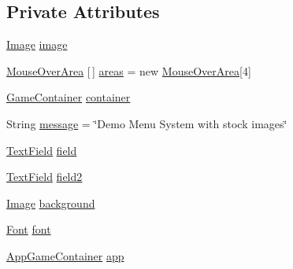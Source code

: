 \subsection*{Private Attributes}
\begin{DoxyCompactItemize}
\item 
\mbox{\hyperlink{classorg_1_1newdawn_1_1slick_1_1_image}{Image}} \mbox{\hyperlink{classorg_1_1newdawn_1_1slick_1_1tests_1_1_g_u_i_test_aa3aa6128aa0296efb8c6489084ce0a29}{image}}
\item 
\mbox{\hyperlink{classorg_1_1newdawn_1_1slick_1_1gui_1_1_mouse_over_area}{Mouse\+Over\+Area}} \mbox{[}$\,$\mbox{]} \mbox{\hyperlink{classorg_1_1newdawn_1_1slick_1_1tests_1_1_g_u_i_test_a45e7638907d2d4662aca08ffa006a326}{areas}} = new \mbox{\hyperlink{classorg_1_1newdawn_1_1slick_1_1gui_1_1_mouse_over_area}{Mouse\+Over\+Area}}\mbox{[}4\mbox{]}
\item 
\mbox{\hyperlink{classorg_1_1newdawn_1_1slick_1_1_game_container}{Game\+Container}} \mbox{\hyperlink{classorg_1_1newdawn_1_1slick_1_1tests_1_1_g_u_i_test_a71a14c16d92d7fbb77511e4fc241e8b9}{container}}
\item 
String \mbox{\hyperlink{classorg_1_1newdawn_1_1slick_1_1tests_1_1_g_u_i_test_abd20571a152e1beddc3e70a5c3e348a6}{message}} = \char`\"{}Demo Menu System with stock images\char`\"{}
\item 
\mbox{\hyperlink{classorg_1_1newdawn_1_1slick_1_1gui_1_1_text_field}{Text\+Field}} \mbox{\hyperlink{classorg_1_1newdawn_1_1slick_1_1tests_1_1_g_u_i_test_ac005591c69d926ba54c72956127cc998}{field}}
\item 
\mbox{\hyperlink{classorg_1_1newdawn_1_1slick_1_1gui_1_1_text_field}{Text\+Field}} \mbox{\hyperlink{classorg_1_1newdawn_1_1slick_1_1tests_1_1_g_u_i_test_a1365fed5962b416d829b81fc02d7d60e}{field2}}
\item 
\mbox{\hyperlink{classorg_1_1newdawn_1_1slick_1_1_image}{Image}} \mbox{\hyperlink{classorg_1_1newdawn_1_1slick_1_1tests_1_1_g_u_i_test_aa63cadd39b15e1dd6eef04bba3ceedcb}{background}}
\item 
\mbox{\hyperlink{interfaceorg_1_1newdawn_1_1slick_1_1_font}{Font}} \mbox{\hyperlink{classorg_1_1newdawn_1_1slick_1_1tests_1_1_g_u_i_test_ae827e316c6fbf350d3221fa2e824265d}{font}}
\item 
\mbox{\hyperlink{classorg_1_1newdawn_1_1slick_1_1_app_game_container}{App\+Game\+Container}} \mbox{\hyperlink{classorg_1_1newdawn_1_1slick_1_1tests_1_1_g_u_i_test_ab8fc86430409e7a33c9f89928ff238b2}{app}}
\end{DoxyCompactItemize}
